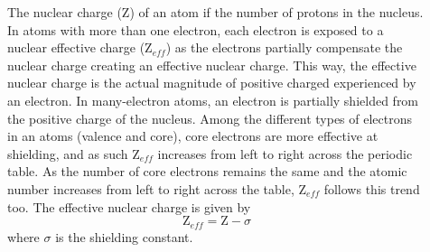 \documentclass[main.tex]{subfiles}
\newcommand\chapterlabel{electrons}
\begin{document}
\sloppy
\begin{description}

\item[] 
The nuclear charge (Z) of an atom if the number of protons in the nucleus. In atoms with more than one electron, each electron is exposed to a nuclear effective charge ($\text{Z}_{eff}$) as the electrons partially compensate the nuclear charge creating an effective nuclear charge. This way, the effective nuclear charge is the actual magnitude of positive charged experienced by an electron. In many-electron atoms, an electron is partially shielded from the positive charge of the nucleus. Among the different types of electrons in an atoms (valence and core), core electrons are more effective at shielding, and as such $\text{Z}_{eff}$ increases from left to right across the periodic table. As the number of core electrons remains the same and the atomic number increases from left to right across the table, $\text{Z}_{eff}$ follows this trend too. The effective nuclear charge is given by
\begin{equation*}
\text{Z}_{eff}=\text{Z} - \sigma
\end{equation*}
where $\sigma$ is the shielding constant.





     \label{Fig:{\chapterlabel}\thefigurenewcounter}



 \vspace{0cm}\hspace{-6cm}\begin{minipage}[b]{1.5\linewidth}
\begin{center}
\end{center}
\end{minipage}
\end{description}
\end{document}
